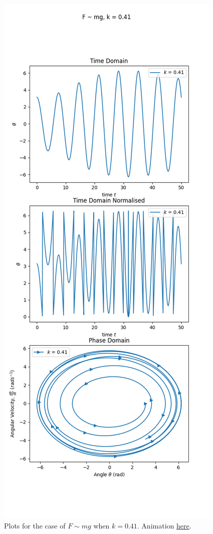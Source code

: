 \documentclass[10pt, twocolumn]{article}
\begin{document}
\begin{figure}[H]
    \centering
    \includegraphics[width = 0.9\columnwidth]{Projects/ForcedSimplePendulum/Plots/Plot of F~mg, k is 0.41.png}
    \caption{Plots for the case of $F\sim{mg}$ when $k = 0.41$. Animation \href{https://github.com/linsuong/PHYS-6017-Labs/blob/main/Projects/ForcedSimplePendulum/Plots/F~mg\%2C\%20k\%20is\%200.41.gif}{here}.}
    \label{k = 0.41}
\end{figure}
\end{document}
